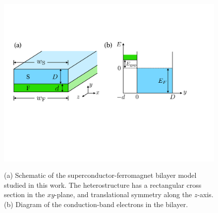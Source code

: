 \documentclass[aps,prl,twocolumn,superscriptaddress,showpacs,longbibliography]{revtex4-1}
\begin{document}
\begin{figure}
\centering
{\includegraphics[width = \linewidth]{Fig_1.pdf}}
\caption{(a) Schematic of the superconductor-ferromagnet bilayer model studied in this work. The heterostructure has a rectangular cross section in the $xy$-plane, and translational symmetry along the $z$-axis. (b) Diagram of the conduction-band electrons in the bilayer.}
\label{fig:Fig_1}
\end{figure}
\end{document}
